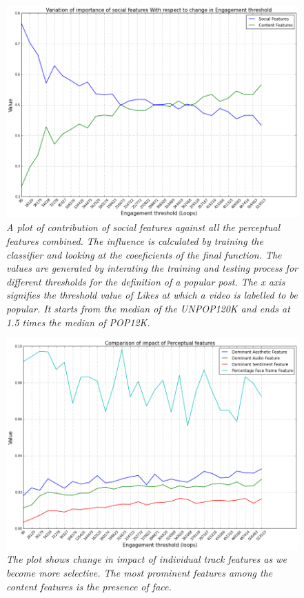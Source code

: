 \begin{figure}[!htb]
\centering
\includegraphics[width=\columnwidth]{plots/EngagementFeatureImpact}
\caption{\textsl{ A plot of contribution of social features against all the perceptual features combined. The influence is calculated by training the classifier and looking at the coeeficients of the final function. The values are generated by interating the training and testing process for different thresholds for the definition of a popular post. The x axis signifies the threshold value of Likes at which a video is labelled to be popular. It starts from the median of the UNPOP120K and ends at 1.5 times the median of POP12K. }}
\label{fig:Feature_importance}
\end{figure}



\begin{figure}[!htb]
\centering
\includegraphics[width=\columnwidth]{plots/EngagementContentFeatureImpact}
\caption{\textsl{ The plot shows change in impact of individual track features as we become more selective. The most prominent features among the content features is the presence of face. }}
\label{fig:Feature_importance_content}
\end{figure}


